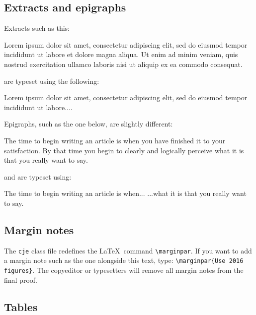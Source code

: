 \documentclass{cje}          %
\theoremstyle{plain}%
\theoremstyle{definition}
\theoremstyle{remark}
\begin{document}
\subsection{Extracts and epigraphs}
Extracts such as this:
\begin{extract}
Lorem ipsum dolor sit amet, consectetur adipiscing elit, sed do eiusmod tempor incididunt ut labore et dolore magna aliqua. Ut enim ad minim veniam, quis nostrud exercitation ullamco laboris nisi ut aliquip ex ea commodo consequat. 
\end{extract}
are typeset using the following:
\begin{smallverbatim}
\begin{extract}
Lorem ipsum dolor sit amet, consectetur adipiscing elit, sed do eiusmod tempor incididunt ut labore.... 
\end{extract}
\end{smallverbatim}

Epigraphs, such as the one below, are slightly different:
\begin{epigraph}
The time to begin writing an article is when you have finished it to your satisfaction. By that time you begin to clearly and logically perceive what it is that you really want to say.
\end{epigraph}
and are typeset using:
\begin{smallverbatim}
\begin{epigraph}
The time to begin writing an article is when...
  ...what it is that you really want to say.
\end{epigraph}
\end{smallverbatim}

\subsection{Margin notes}

The \texttt{cje} class file redefines the \LaTeX\ command \verb"\marginpar". If you want to add a margin note such as the one alongside this text, type: \verb"\marginpar{Use 2016 figures}". The copyeditor or typesetters will remove all margin notes from the final proof.

\subsection{Tables}
\end{document}
